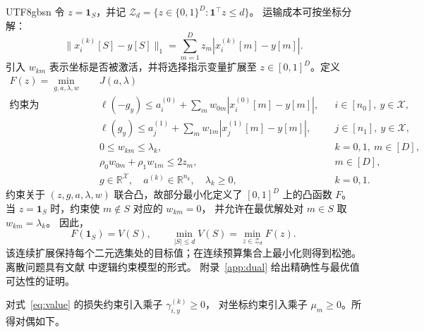 \documentclass[11pt,a4paper]{article}
\theoremstyle{plain}
\begin{document}
\begin{CJK*}{UTF8}{gbsn}
令 $z=\mathbf1_S$，并记
$\mathcal Z_d=\{z\in\{0,1\}^D:\mathbf1^\top z\le d\}$。
运输成本可按坐标分解：
\[
\|x_i^{(k)}[S]-y[S]\|_1
=\sum_{m=1}^D z_m|x_i^{(k)}[m]-y[m]|.
\]
引入 $w_{km}$ 表示坐标是否被激活，并将选择指示变量扩展至
$z\in[0,1]^D$。定义
\begin{equation}\label{eq:value}
\begin{aligned}
F(z)=\min_{g,a,\lambda,w}\quad&J(a,\lambda)\\
\text{约束为}\quad&
\ell(-g_y)\le a_i^{(0)}+\sum_m w_{0m}|x_i^{(0)}[m]-y[m]|,
&&i\in[n_0],\ y\in\mathcal X,\\
&\ell(g_y)\le a_j^{(1)}+\sum_m w_{1m}|x_j^{(1)}[m]-y[m]|,
&&j\in[n_1],\ y\in\mathcal X,\\
&0\le w_{km}\le\lambda_k,&&k=0,1,\ m\in[D],\\
&\rho_0w_{0m}+\rho_1w_{1m}\le2z_m,&&m\in[D],\\
&g\in\mathbb R^{\mathcal X},\quad a^{(k)}\in\mathbb R^{n_k},
\quad\lambda_k\ge0,&&k=0,1.
\end{aligned}
\end{equation}
约束关于 $(z,g,a,\lambda,w)$ 联合凸，故部分最小化定义了
$[0,1]^D$ 上的凸函数 $F$。
当 $z=\mathbf1_S$ 时，约束使 $m\notin S$ 对应的 $w_{km}=0$，
并允许在最优解处对 $m\in S$ 取 $w_{km}=\lambda_k$。
因此，
\begin{equation}\label{eq:binary-exact}
F(\mathbf1_S)=V(S),\qquad
\min_{|S|\le d}V(S)=\min_{z\in\mathcal Z_d}F(z).
\end{equation}
该连续扩展保持每个二元选集处的目标值；在连续预算集合上最小化则得到松弛。
离散问题具有文献 \cite[问题~(2.1)--(2.2)]{bertsimas2021unified} 中逻辑约束模型的形式。
附录~\ref{app:dual} 给出精确性与最优值可达性的证明。

对式~\eqref{eq:value} 的损失约束引入乘子 $\gamma_{i,y}^{(k)}\ge0$，
对坐标约束引入乘子 $\mu_m\ge0$。所得对偶如下。


\end{CJK*}
\end{document}
